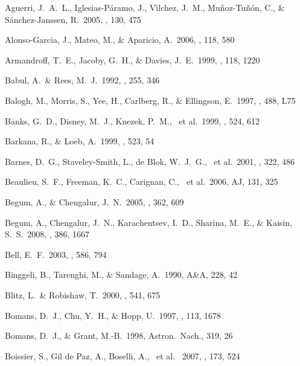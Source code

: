 \documentclass[12pt,onecolumn]{emulateapj}
\begin{document}
\clearpage
\newpage

\begin{thebibliography}{}

Aguerri, J.~A.~L., Iglesias-P{\'a}ramo, J., V{\'{\i}}lchez, J.~M., 
Mu{\~n}oz-Tu{\~n}{\'o}n, C., \& S{\'a}nchez-Janssen, R.\ 2005, \aj, 130, 475 

Alonso-Garcia, J., Mateo, M., \& Aparicio, A.\ 2006, \pasp, 118, 580

Armandroff, T.~E., Jacoby, G.~H., \& Davies, J.~E.\ 1999, \aj, 118, 1220

Babul, A.~\& Rees, M.~J.\ 1992, \mnras, 255, 346 

Balogh, M., Morris, S., Yee, H., Carlberg, R., \& Ellingson, E.\ 1997, \apj, 488, L75 

Banks, G.~D., Disney, M.~J., Knezek, P.~M.,  ~et al.\ 1999, \apj, 524, 612 

Barkana, R., \& Loeb, A.\ 1999, \apj, 523, 54

Barnes, D.~G., Staveley-Smith, L., de Blok, W.~J.~G., ~et al.\ 2001, \mnras, 322, 486 

Beaulieu, S.~F., Freeman, K.~C., Carignan, C., ~et al.\ 2006, AJ, 131, 325 

Begum, A., \& Chengalur, J.~N.\ 2005, \mnras, 362, 609 

Begum, A., Chengalur, J.~N., Karachentsev, I.~D., Sharina, M.~E., \& Kaisin, S.~S.\ 2008, \mnras, 386, 1667

Bell, E.~F.\ 2003, \apj, 586, 794

Binggeli, B., Tarenghi, M., \& Sandage, A.\ 1990, A\&A, 228, 42

Blitz, L.~\& Robishaw, T.\ 2000, \apj, 541, 675 

Bomans, D.~J., Chu, Y.~H., \& Hopp, U.\ 1997, \aj , 113, 1678

Bomans, D.~J., \& Grant, M.-B.\ 1998, Astron.\ Nach., 319, 26

Boissier, S., Gil de Paz, A., Boselli, A., ~et al. \ 2007, \apj, 173, 524 


\end{thebibliography}
\end{document}

